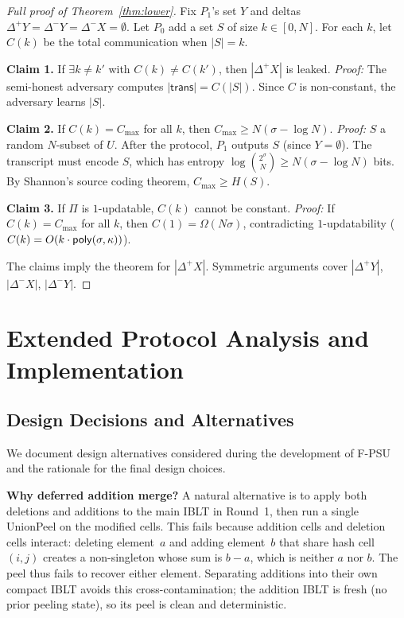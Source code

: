 \documentclass[letterpaper,twocolumn,10pt]{article}
\theoremstyle{definition}
\begin{document}
\begin{proof}[Full proof of Theorem~\ref{thm:lower}]
Fix $P_1$'s set $Y$ and deltas $\Delta^+ Y = \Delta^- Y = \Delta^- X =
\emptyset$. Let $P_0$ add a set $S$ of size $k \in [0, N]$. For each $k$,
let $C(k)$ be the total communication when $|S| = k$.

\textbf{Claim 1.} If $\exists k \neq k'$ with $C(k) \neq C(k')$, then
$|\Delta^+ X|$ is leaked. \emph{Proof:} The semi-honest adversary computes
$|\mathsf{trans}| = C(|S|)$. Since $C$ is non-constant, the adversary learns
$|S|$.

\textbf{Claim 2.} If $C(k) = C_{\max}$ for all $k$, then $C_{\max} \geq
N(\sigma - \log N)$. \emph{Proof:} $S$ a random $N$-subset of $U$. After the
protocol, $P_1$ outputs $S$ (since $Y = \emptyset$). The transcript must
encode $S$, which has entropy $\log\binom{2^\sigma}{N} \geq N(\sigma - \log
N)$ bits. By Shannon's source coding theorem, $C_{\max} \geq H(S)$.

\textbf{Claim 3.} If $\Pi$ is $1$-updatable, $C(k)$ cannot be constant.
\emph{Proof:} If $C(k) = C_{\max}$ for all $k$, then $C(1) = \Omega(N\sigma)$,
contradicting $1$-updatability ($C(k) = O(k \cdot \mathsf{poly}(\sigma, \kappa))$).

The claims imply the theorem for $|\Delta^+ X|$. Symmetric arguments cover
$|\Delta^+ Y|$, $|\Delta^- X|$, $|\Delta^- Y|$.
\end{proof}

\section{Extended Protocol Analysis and Implementation}
\label{sec:ext-protocol-main}

\subsection{Design Decisions and Alternatives}

We document design alternatives considered during the development of F-PSU
and the rationale for the final design choices.

\smallskip\noindent\textbf{Why deferred addition merge?}
A natural alternative is to apply both deletions and additions to the main
IBLT in Round~1, then run a single UnionPeel on the modified cells. This
fails because addition cells and deletion cells interact: deleting element~$a$
and adding element~$b$ that share hash cell~$(i,j)$ creates a non-singleton
whose sum is $b - a$, which is neither $a$ nor $b$. The peel thus fails to
recover either element. Separating additions into their own compact IBLT
avoids this cross-contamination; the addition IBLT is fresh (no prior peeling
state), so its peel is clean and deterministic.
\end{document}
